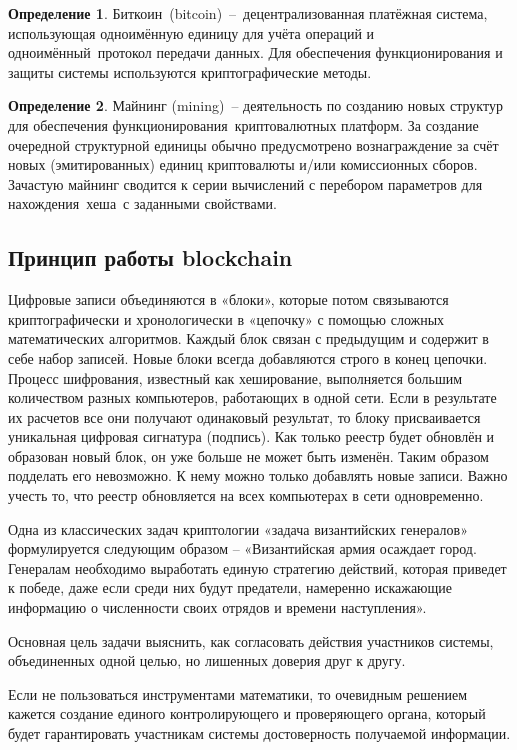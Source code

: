\documentclass[och, master, nir]{SCWorks_fix}
\theoremstyle{plain}
\theoremstyle{plain}
\theoremstyle{plain}
\theoremstyle{definition}
\newtheorem{defn}{Определение}
\begin{document}
\begin{defn}
Биткоин (bitcoin) – децентрализованная платёжная система, использующая одноимённую единицу для учёта операций и одноимённый протокол передачи данных. Для обеспечения функционирования и защиты системы используются криптографические методы.
\end{defn}

\begin{defn}
Майнинг (mining) – деятельность по созданию новых структур для обеспечения функционирования криптовалютных платформ. За создание очередной структурной единицы обычно предусмотрено вознаграждение за счёт новых (эмитированных) единиц криптовалюты и/или комиссионных сборов. Зачастую майнинг сводится к серии вычислений с перебором параметров для нахождения хеша с заданными свойствами. 
\end{defn}

\subsection{Принцип работы blockchain}

Цифровые записи объединяются в «блоки», которые потом связываются криптографически и хронологически в «цепочку» с помощью сложных математических алгоритмов. Каждый блок связан с предыдущим и содержит в себе набор записей. Новые блоки всегда добавляются строго в конец цепочки. Процесс шифрования, известный как хеширование, выполняется большим количеством разных компьютеров, работающих в одной сети. Если в результате их расчетов все они получают одинаковый результат, то блоку присваивается уникальная цифровая сигнатура (подпись). Как только реестр будет обновлён и образован новый блок, он уже больше не может быть изменён. Таким образом подделать его невозможно. К нему можно только добавлять новые записи. Важно учесть то, что реестр обновляется на всех компьютерах в сети одновременно.

Одна из классических задач криптологии «задача византийских генералов» формулируется следующим образом – «Византийская армия осаждает город. Генералам необходимо выработать единую стратегию действий, которая приведет к победе, даже если среди них будут предатели, намеренно искажающие информацию о численности своих отрядов и времени наступления».

Основная цель задачи выяснить, как согласовать действия участников системы, объединенных одной целью, но лишенных доверия друг к другу.

Если не пользоваться инструментами математики, то очевидным решением кажется создание единого контролирующего и проверяющего органа, который будет гарантировать участникам системы достоверность получаемой информации.
 
\end{document}
